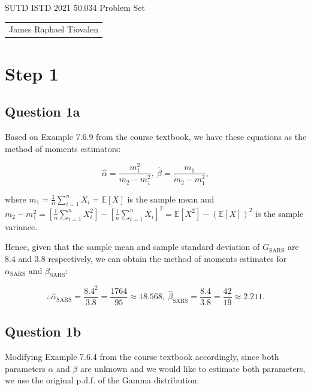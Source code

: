 \documentclass[11pt,fancychapters]{article}
\begin{document}
\centerline{\huge{SUTD ISTD 2021 50.034 Problem Set}}

\begin{table}[ht]
\centering
\footnotesize
 \begin{tabular}{c} 
James Raphael Tiovalen
 \end{tabular}
\end{table}

\section*{Step 1}

\subsection*{Question 1a}

Based on Example 7.6.9 from the course textbook, we have these equations as the method of moments estimators:

\begin{equation}\label{eqn1a1}
    \widehat{\alpha} = \frac{m_1^2}{m_2 - m_1^2}, ~
    \widehat{\beta} = \frac{m_1}{m_2 - m_1^2},
\end{equation}

where $m_1 = \frac{1}{n} \sum_{i=1}^n X_i = \mathbb{E}[X]$ is the sample mean and $m_2 - m_1^2 = \left[ \frac{1}{n} \sum_{i=1}^n X_i^2 \right] - \left[ \frac{1}{n} \sum_{i=1}^n X_i \right]^2 = \mathbb{E}[X^2] - (\mathbb{E}[X])^2$ is the sample variance.\newline

Hence, given that the sample mean and sample standard deviation of $G_\text{SARS}$ are $8.4$ and $3.8$ respectively, we can obtain the method of moments estimates for $\alpha_\text{SARS}$ and $\beta_\text{SARS}$:

\begin{tcolorbox}
\begin{equation}\label{eqn1a2}
    \therefore \widehat{\alpha}_\text{SARS} = \frac{8.4^2}{3.8} = \frac{1764}{95} \approx 18.568, ~
    \widehat{\beta}_\text{SARS} = \frac{8.4}{3.8} = \frac{42}{19} \approx 2.211.
\end{equation}
\end{tcolorbox}

\subsection*{Question 1b}

Modifying Example 7.6.4 from the course textbook accordingly, since both parameters $\alpha$ and $\beta$ are unknown and we would like to estimate both parameters, we use the original p.d.f. of the Gamma distribution:
\end{document}
